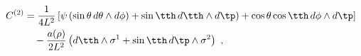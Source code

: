 \begin{equation}
\label{C2}
\begin{split}
  C^{(2)} &= \frac1{4L^2} \left[ \psi \left(\sin\theta \, d\theta \wedge
  d\phi) + \sin\tth \, d\tth \wedge d\tp \right) + \cos\theta \cos\tth
  \, d\phi \wedge d\tp \right] \\
  &\quad - \frac{a(\rho)}{2L^2} \left( d\tth \wedge \sigma^1 +
  \sin\tth \, d\tp \wedge \sigma^2 \right)~, 
\end{split}
\end{equation}

